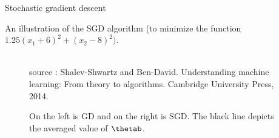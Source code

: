 \begin{vbframe}{Stochastic gradient descent}
  \framebreak
 
 An illustration of the SGD algorithm (to minimize the function $1.25(x_1 + 6)^2 + (x_2 - 8)^2)$.
 \begin{figure}
    \tiny{\\ source : Shalev-Shwartz and  Ben-David.
Understanding machine learning: From theory to algorithms. Cambridge University Press, 2014. }
 \caption{On the left is GD and on the right is SGD. The black line depicts the averaged value of $\thetab$.}
 \end{figure}
 

  \framebreak
  
  

\end{vbframe}

